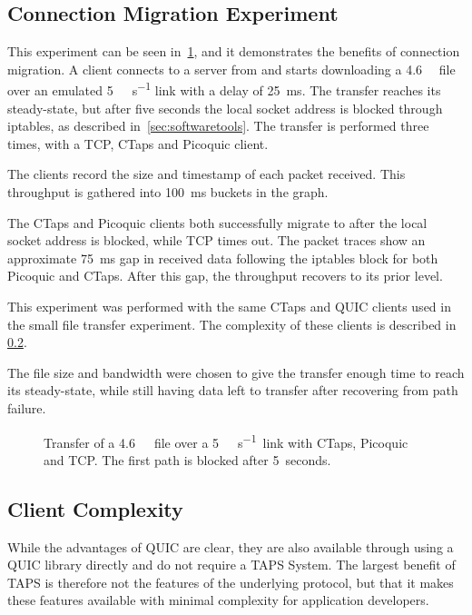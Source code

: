 \subsection{Connection Migration Experiment}\label{sec:path-migration}
This experiment can be seen in~\cref{fig:migration-throughput}, and it
demonstrates the benefits of connection migration. A client connects
to a server from  and starts downloading
a \qty{4.6}{\mega\byte} file over an emulated
\qty{5}{\mega\bit\per\second} link with a delay of \qty{25}{\milli\second}.
The transfer reaches its steady-state, but after five seconds the
local socket address is blocked through iptables, as
described in~\cref{sec:softwaretools}. The transfer is performed
three times, with a TCP, CTaps and Picoquic client.

The clients record the size and timestamp of each packet received.
This throughput is gathered into \qty{100}{\milli\second} buckets in the graph.

The CTaps and Picoquic clients both successfully migrate to  after the local
socket address is blocked, while TCP times out.
The packet traces show an approximate \qty{75}{\milli\second} gap in received data
following the iptables block for both Picoquic and CTaps. After this gap, the throughput recovers to its prior level.

This experiment was performed with the same CTaps and QUIC clients used in the small
file transfer experiment. The complexity of these clients is described in \cref{sec:client-complexity}.

The file size and bandwidth were chosen to give the transfer enough time to reach
its steady-state, while still having data left to transfer after recovering from
path failure.

\begin{figure}[H]
    
    \caption[Connection migration experiment]{Transfer of a \qty{4.6}{\mega\byte}~file over a \qty{5}{\mega\bit\per\second}~link with CTaps, Picoquic and TCP.
    The first path is blocked after 5~seconds.}
    \label{fig:migration-throughput}
\end{figure}

\subsection{Client Complexity}\label{sec:client-complexity}
While the advantages of QUIC are clear, they
are also available through using a QUIC library directly
and do not require a TAPS System.
The largest benefit of TAPS is therefore not the features
of the underlying protocol, but that it makes these
features available with minimal complexity for application developers.

